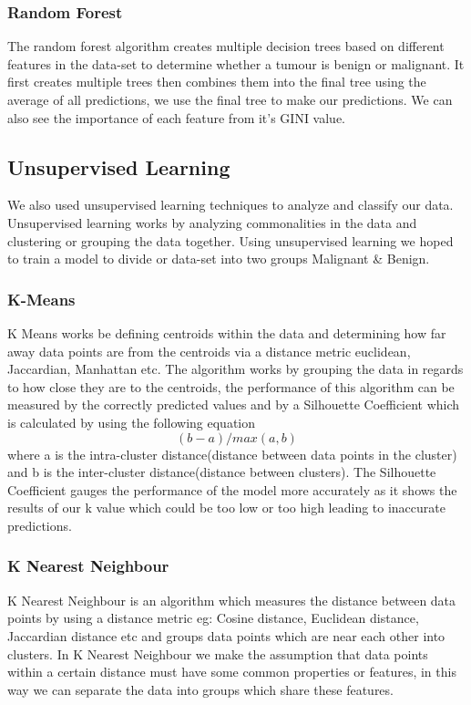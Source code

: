 \documentclass[conference]{IEEEtran}
\begin{document}
\subsubsection{Random Forest}
The random forest algorithm creates multiple decision trees based on different features in the data-set to determine whether a tumour is benign or malignant.  It first creates multiple trees then combines them into the final tree using the average of all predictions, we use the final tree to make our predictions.  We can also see the importance of each feature from it's GINI value.

\subsection{Unsupervised Learning}
We also used unsupervised learning techniques to analyze and classify our data.  Unsupervised learning works by analyzing commonalities in the data and clustering or grouping the data together.  Using unsupervised learning we hoped to train a model to divide or data-set into two groups Malignant \& Benign.

\subsubsection{K-Means}
K Means works be defining centroids within the data and determining how far away data points are from the centroids via a distance metric euclidean, Jaccardian, Manhattan etc.  The algorithm works by grouping the data in regards to how close they are to the centroids, the performance of this algorithm can be measured by the correctly predicted values and by a Silhouette Coefficient which is calculated by using the following equation \[(b - a) / max(a, b)\] where a is the intra-cluster distance(distance between data points in the cluster) and b is the inter-cluster distance(distance between clusters).  The Silhouette Coefficient gauges the performance of the model more accurately as it shows the results of our k value which could be too low or too high leading to inaccurate predictions.

\subsubsection{K Nearest Neighbour}
K Nearest Neighbour is an algorithm which measures the distance between data points by using a distance metric eg: Cosine distance, Euclidean distance, Jaccardian distance etc and groups data points which are near each other into clusters.  In K Nearest Neighbour we make the assumption that data points within a certain distance must have some common properties or features, in this way we can separate the data into groups which share these features.
\end{document}

